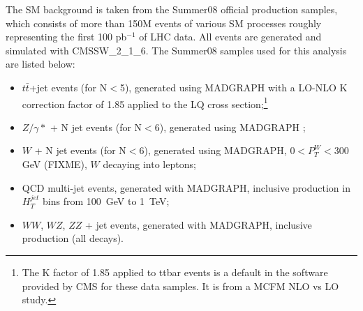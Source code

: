 
The SM background is taken from the Summer08 official production samples,
which consists of more than 150M events of various SM processes roughly representing the first 100 pb$^{-1}$ of LHC data.
All events are generated and simulated with CMSSW\_2\_1\_6. 
The Summer08 samples used for this analysis are listed below:
\begin{itemize}
%
\item $t\bar{t}$+jet events (for N$<$5), generated using MADGRAPH \cite{Mangano:2002ea} with a 
LO-NLO K correction factor of 1.85 applied 
to the LQ cross section;\footnote{The K factor of 1.85 applied to ttbar events is a default in the software provided by CMS for 
 these data samples.  It is from a MCFM NLO vs LO study.}
%
\item $Z/\gamma*$ + N jet events (for N$<$6), generated using MADGRAPH
;  
%
\item $W$ + N jet events (for N$<$6), generated using MADGRAPH, $ 0 < P_{T}^{W} < 300 $ GeV (FIXME), $W$ decaying into leptons;  
%
\item QCD multi-jet events, generated with MADGRAPH, inclusive production in $H_{T}^{jet}$ bins from 100~GeV to 1~TeV;  
%
%
\item $WW$, $WZ$, $ZZ$ + jet events, generated with MADGRAPH, inclusive production (all decays).
\end{itemize} 


%
